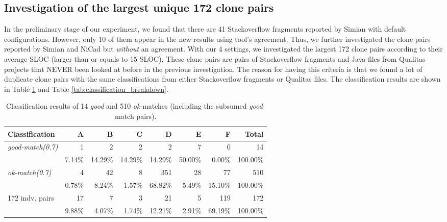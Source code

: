 \documentclass{IEEEtran}
\begin{document}
\subsection{Investigation of the largest unique 172 clone pairs}
In the preliminary stage of our experiment, we found that there are 41 Stackoverflow fragments reported by Simian with default configurations. However, only 10 of them appear in the new results using tool's agreement. Thus, we further investigated the clone pairs reported by Simian and NiCad but \textit{without} an agreement. With our 4 settings, we investigated the largest 172 clone pairs according to their average SLOC (larger than or equals to 15 SLOC). These clone pairs are pairs of Stackoverflow fragments and Java files from Qualitas projects that NEVER been looked at before in the previous investigation. The reason for having this criteria is that we found a lot of duplicate clone pairs with the same classifications from either Stackoverflow fragments or Qualitas files. The classification results are shown in Table \ref{tab:classification} and Table \ref{tab:classification_breakdown}.


\begin{table}[H]
	\centering
	\caption{Classification results of 14 \textit{good} and 510 \textit{ok}-matches (including the subsumed \textit{good}-match pairs).}
	\label{tab:classification}
	\begin{tabular}{|l|r|r|r|r|r|r|r|}
		\hline 
		Classification & A & B & C & D & E & F & Total \\ 
		\hline 
		\multirow{2}{*}{\textit{good-match(0.7)}} & 1 & 2 & 2 & 2 & 7 & 0 & 14 \\ \cline{2-8}
		& 7.14\%	& 14.29\%	& 14.29\%	& 14.29\%	& 50.00\%	& 0.00\%	& 100.00\% \\ 
		\hline
		\multirow{2}{*}{\textit{ok-match(0.7)}} & 4 & 42 & 8 & 351 & 28 & 77 & 510 \\ \cline{2-8}
		& 0.78\%	& 8.24\%	&	1.57\%	&	68.82\%	&	5.49\%	&	15.10\%	&	100.00\%  \\ 
		\hline
		\multirow{2}{*}{172 indv. pairs} & 17 & 7 & 3 & 21 & 5 & 119 & 172 \\ \cline{2-8}
		& 9.88\% & 4.07\% & 1.74\% & 12.21\% & 2.91\% & 69.19\% & 100.00\%  \\ 
		\hline
	\end{tabular} 
\end{table}
\end{document}

